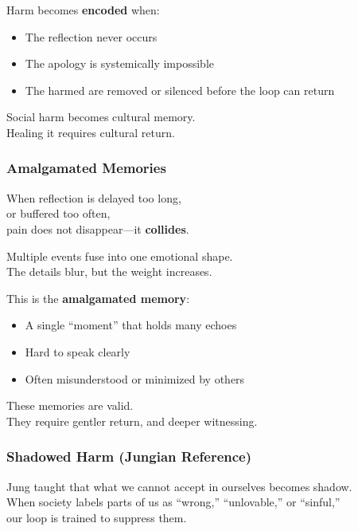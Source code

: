 Harm becomes \textbf{encoded} when:

\begin{itemize}
\item
  The reflection never occurs
\item
  The apology is systemically impossible
\item
  The harmed are removed or silenced before the loop can return
\end{itemize}

Social harm becomes cultural memory.\\
Healing it requires cultural return.

\subsubsection{\texorpdfstring{\textbf{Amalgamated
Memories}}{Amalgamated Memories}}\label{amalgamated-memories-1}

When reflection is delayed too long,\\
or buffered too often,\\
pain does not disappear---it \textbf{collides}.

Multiple events fuse into one emotional shape.\\
The details blur, but the weight increases.

This is the \textbf{amalgamated memory}:

\begin{itemize}
\item
  A single ``moment'' that holds many echoes
\item
  Hard to speak clearly
\item
  Often misunderstood or minimized by others
\end{itemize}

These memories are valid.\\
They require gentler return, and deeper witnessing.

\subsubsection{\texorpdfstring{\textbf{Shadowed Harm (Jungian
Reference)}}{Shadowed Harm (Jungian Reference)}}\label{shadowed-harm-jungian-reference-1}

Jung taught that what we cannot accept in ourselves becomes shadow.\\
When society labels parts of us as ``wrong,'' ``unlovable,'' or
``sinful,''\\
our loop is trained to suppress them.


